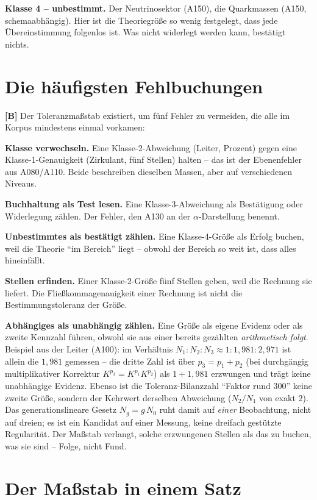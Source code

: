 \textbf{Klasse 4 -- unbestimmt.} Der Neutrinosektor (A150), die Quarkmassen
(A150, schemaabhängig). Hier ist die Theoriegröße so wenig festgelegt, dass jede
Übereinstimmung folgenlos ist. Was nicht widerlegt werden kann, bestätigt nichts.

\section{Die häufigsten Fehlbuchungen}

\textbf{[B]} Der Toleranzmaßstab existiert, um fünf Fehler zu vermeiden, die
alle im Korpus mindestens einmal vorkamen:

\textbf{Klasse verwechseln.} Eine Klasse-2-Abweichung (Leiter, Prozent) gegen
eine Klasse-1-Genauigkeit (Zirkulant, fünf Stellen) halten -- das ist der
Ebenenfehler aus A080/A110. Beide beschreiben dieselben Massen, aber auf
verschiedenen Niveaus.

\textbf{Buchhaltung als Test lesen.} Eine Klasse-3-Abweichung als Bestätigung
oder Widerlegung zählen. Der Fehler, den A130 an der $\alpha$-Darstellung
benennt.

\textbf{Unbestimmtes als bestätigt zählen.} Eine Klasse-4-Größe als Erfolg
buchen, weil die Theorie \enquote{im Bereich} liegt -- obwohl der Bereich so
weit ist, dass alles hineinfällt.

\textbf{Stellen erfinden.} Einer Klasse-2-Größe fünf Stellen geben, weil die
Rechnung sie liefert. Die Fließkommagenauigkeit einer Rechnung ist nicht die
Bestimmungstoleranz der Größe.

\textbf{Abhängiges als unabhängig zählen.} Eine Größe als eigene Evidenz oder als
zweite Kennzahl führen, obwohl sie aus einer bereits gezählten \emph{arithmetisch
folgt}. Beispiel aus der Leiter (A100): im Verhältnis
$N_1{:}N_2{:}N_3 \approx 1{:}1{,}981{:}2{,}971$ ist allein die $1{,}981$ gemessen
-- die dritte Zahl ist über $p_3 = p_1 + p_2$ (bei durchgängig multiplikativer
Korrektur $K^{p_3} = K^{p_1}K^{p_2}$) als $1 + 1{,}981$ erzwungen und trägt keine
unabhängige Evidenz. Ebenso ist die Toleranz-Bilanzzahl \enquote{Faktor rund
$300$} keine zweite Größe, sondern der Kehrwert derselben Abweichung ($N_2/N_1$
von exakt $2$). Das generationslineare Gesetz $N_g = g\,N_0$ ruht damit auf
\emph{einer} Beobachtung, nicht auf dreien; es ist ein Kandidat auf einer
Messung, keine dreifach gestützte Regularität. Der Maßstab
verlangt, solche erzwungenen Stellen als das zu buchen, was sie sind -- Folge,
nicht Fund.

\section{Der Maßstab in einem Satz}

